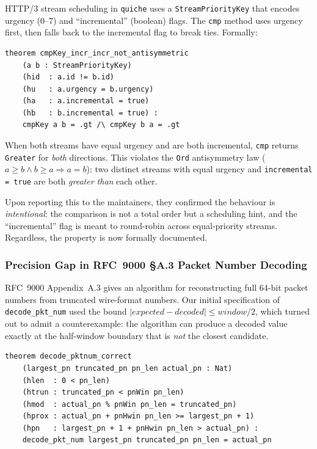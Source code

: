 \documentclass[sigconf,10pt]{acmart}
\begin{document}
HTTP/3 stream scheduling in \texttt{quiche} uses a
\texttt{StreamPriorityKey} that encodes urgency (0--7) and
``incremental'' (boolean) flags.
The \texttt{cmp} method uses urgency first, then falls back to the
incremental flag to break ties.
Formally:

\begin{lstlisting}[caption={\texttt{cmpKey} in Lean~4: both-incremental case.}]
theorem cmpKey_incr_incr_not_antisymmetric
    (a b : StreamPriorityKey)
    (hid  : a.id != b.id)
    (hu   : a.urgency = b.urgency)
    (ha   : a.incremental = true)
    (hb   : b.incremental = true) :
    cmpKey a b = .gt /\ cmpKey b a = .gt
\end{lstlisting}

When both streams have equal urgency and are both incremental, \texttt{cmp}
returns \texttt{Greater} for \emph{both} directions.
This violates the \texttt{Ord} antisymmetry law ($a \geq b \wedge b \geq a
\Rightarrow a = b$): two distinct streams with equal urgency and
\texttt{incremental = true} are both \emph{greater than} each other.

Upon reporting this to the maintainers, they confirmed the behaviour is
\emph{intentional}: the comparison is not a total order but a scheduling
hint, and the ``incremental'' flag is meant to round-robin across
equal-priority streams.
Regardless, the property is now formally documented.

\subsubsection{Precision Gap in RFC~9000 \S A.3 Packet Number Decoding}

RFC~9000 Appendix~A.3 gives an algorithm for reconstructing full
64-bit packet numbers from truncated wire-format numbers.
Our initial specification of \texttt{decode\_pkt\_num} used the bound
$|\mathit{expected} - \mathit{decoded}| \leq \mathit{window}/2$, which
turned out to admit a counterexample: the algorithm can produce a decoded
value exactly at the half-window boundary that is \emph{not} the closest
candidate.

\begin{lstlisting}[caption={\texttt{decode\_pktnum\_correct}: the RFC-faithful spec.}]
theorem decode_pktnum_correct
    (largest_pn truncated_pn pn_len actual_pn : Nat)
    (hlen  : 0 < pn_len)
    (htrun : truncated_pn < pnWin pn_len)
    (hmod  : actual_pn % pnWin pn_len = truncated_pn)
    (hprox : actual_pn + pnHwin pn_len >= largest_pn + 1)
    (hpn   : largest_pn + 1 + pnHwin pn_len > actual_pn) :
    decode_pkt_num largest_pn truncated_pn pn_len = actual_pn
\end{lstlisting}
\end{document}

